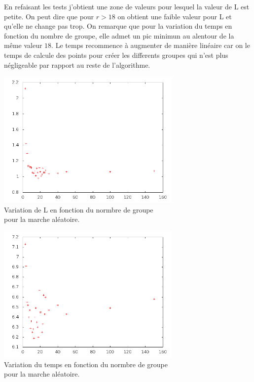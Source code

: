 \documentclass[a4paper,10pt]{report}
\begin{document}
En refaisant les tests j'obtient une zone de valeurs pour lesquel la valeur de L est petite. On peut dire que pour $ r > 18$ on obtient une faible valeur pour L et qu'elle ne change pas trop.
On remarque que pour la variation du temps en fonction du nombre de groupe, elle admet un pic minimun au alentour de la même valeur $18$. Le temps recommence à augmenter de manière linéaire
car on le temps de calcule des points pour créer les differents groupes qui n'est plus négligeable par rapport au reste de l'algorithme.
\begin{center}
  \includegraphics[width = 9cm]{variation_L.png}\\
  Variation de L en fonction du normbre de groupe\\
    pour la marche aléatoire.
\end{center}

\begin{center}
  \includegraphics[width = 9cm]{variation_temps_en_fct_nbre_groupe.png}\\
  Variation du temps en fonction du normbre de groupe\\
    pour la marche aléatoire.
\end{center}
\end{document}
